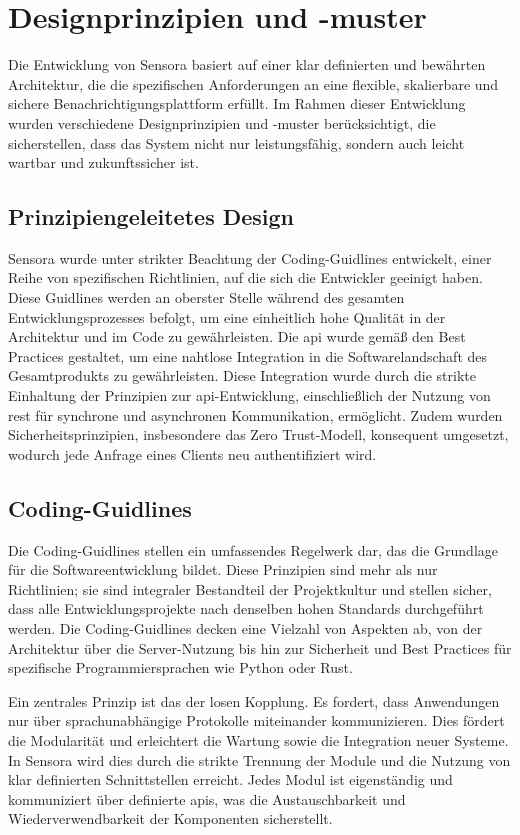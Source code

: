 
\section{Designprinzipien und -muster}
Die Entwicklung von Sensora basiert auf einer klar definierten und bewährten Architektur, die die spezifischen Anforderungen an eine flexible, skalierbare und sichere Benachrichtigungsplattform erfüllt. Im Rahmen dieser Entwicklung wurden verschiedene Designprinzipien und -muster berücksichtigt, die sicherstellen, dass das System nicht nur leistungsfähig, sondern auch leicht wartbar und zukunftssicher ist.

\subsection{Prinzipiengeleitetes Design}
Sensora wurde unter strikter Beachtung der Coding-Guidlines entwickelt, einer Reihe von spezifischen Richtlinien, auf die sich die Entwickler geeinigt haben. Diese Guidlines werden an oberster Stelle während des gesamten Entwicklungsprozesses befolgt, um eine einheitlich hohe Qualität in der Architektur und im Code zu gewährleisten. Die \ac{api} wurde gemäß den Best Practices gestaltet, um eine nahtlose Integration in die Softwarelandschaft des Gesamtprodukts zu gewährleisten. Diese Integration wurde durch die strikte Einhaltung der Prinzipien zur \ac{api}-Entwicklung, einschließlich der Nutzung von \ac{rest} für synchrone und asynchronen Kommunikation, ermöglicht. Zudem wurden Sicherheitsprinzipien, insbesondere das Zero Trust-Modell, konsequent umgesetzt, wodurch jede Anfrage eines Clients neu authentifiziert wird.

\subsection{Coding-Guidlines}
Die Coding-Guidlines stellen ein umfassendes Regelwerk dar, das die Grundlage für die Softwareentwicklung bildet. Diese Prinzipien sind mehr als nur Richtlinien; sie sind integraler Bestandteil der Projektkultur und stellen sicher, dass alle Entwicklungsprojekte nach denselben hohen Standards durchgeführt werden. Die Coding-Guidlines decken eine Vielzahl von Aspekten ab, von der Architektur über die Server-Nutzung bis hin zur Sicherheit und Best Practices für spezifische Programmiersprachen wie Python oder Rust.

Ein zentrales Prinzip ist das der losen Kopplung. Es fordert, dass Anwendungen nur über sprachunabhängige Protokolle miteinander kommunizieren. Dies fördert die Modularität und erleichtert die Wartung sowie die Integration neuer Systeme. In Sensora wird dies durch die strikte Trennung der Module und die Nutzung von klar definierten Schnittstellen erreicht. Jedes Modul ist eigenständig und kommuniziert über definierte \acp{api}, was die Austauschbarkeit und Wiederverwendbarkeit der Komponenten sicherstellt.

